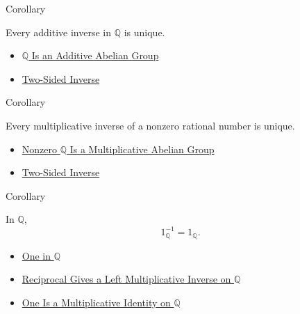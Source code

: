\begin{corollarybox}{Corollary}
\begin{corollary}
\label{cor:uniqueness-additive-inverse-on-q}
Every additive inverse in $\mathbb{Q}$ is unique.
\end{corollary}
\end{corollarybox}

\begin{dependencies}
\begin{itemize}
  \item \hyperref[thm:q-additive-abelian-group]{$\mathbb{Q}$ Is an Additive Abelian Group}
  \item \hyperref[def:two-sided-inverse]{Two-Sided Inverse}
\end{itemize}
\end{dependencies}

\begin{corollarybox}{Corollary}
\begin{corollary}
\label{cor:uniqueness-multiplicative-inverse-on-q}
Every multiplicative inverse of a nonzero rational number is unique.
\end{corollary}
\end{corollarybox}

\begin{dependencies}
\begin{itemize}
  \item \hyperref[thm:q-nonzero-multiplicative-abelian-group]{Nonzero $\mathbb{Q}$ Is a Multiplicative Abelian Group}
  \item \hyperref[def:two-sided-inverse]{Two-Sided Inverse}
\end{itemize}
\end{dependencies}

\begin{corollarybox}{Corollary}
\begin{corollary}
\label{cor:inverse-of-one-is-one-on-q}
In $\mathbb{Q}$,
\[
1_{\mathbb{Q}}^{-1}=1_{\mathbb{Q}}.
\]
\end{corollary}
\end{corollarybox}

\begin{dependencies}
\begin{itemize}
  \item \hyperref[def:one-in-q]{One in $\mathbb{Q}$}
  \item \hyperref[thm:reciprocal-left-multiplicative-inverse-on-q]{Reciprocal Gives a Left Multiplicative Inverse on $\mathbb{Q}$}
  \item \hyperref[thm:one-multiplicative-identity-on-q]{One Is a Multiplicative Identity on $\mathbb{Q}$}
\end{itemize}
\end{dependencies}

